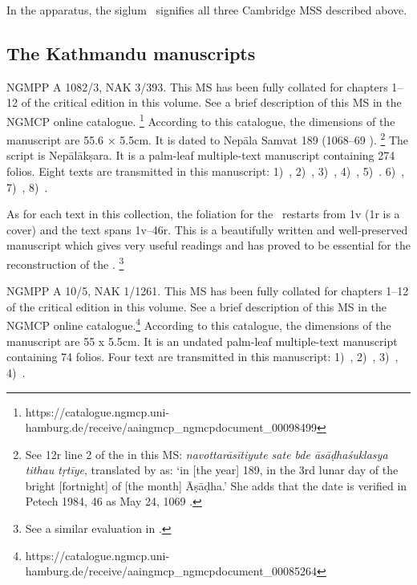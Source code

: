 In the apparatus, the siglum \mssCaCbCc\ signifies all three Cambridge 
MSS described above.

\medskip
\subsection{The Kathmandu manuscripts}
NGMPP A 1082/3, NAK 3/393. This MS has been fully 
collated for chapters 1--12 of the critical edition in this volume. 
See a brief description of this MS in
the NGMCP online catalogue.%
	\footnote{https://catalogue.ngmcp.uni-hamburg.de/receive/aaingmcp\_ngmcpdocument\_00098499}
According to this catalogue, the dimensions of the 
manuscript are 55.6 × 5.5cm. 
It is dated to Nepāla Samvat 189 (1068--69 \CE).%
	\footnote{See \fol12r line 2 of the 
	 in this MS: 
	\emph{navottarāsītiyute sate bde āsāḍhaśuklasya
  tithau tṛtīye}, translated by  as: 
  `in {[}the year{]} 189, in the 3rd lunar day of the bright {[}fortnight{]}
  of {[}the month{]} Āṣāḍha.' She adds that the date is verified in
  Petech 1984, 46 as May 24, 1069 \CE.} The script is Nepālākṣara. It is
a palm-leaf multiple-text manuscript containing 274 folios. Eight texts
are transmitted in this manuscript: 
1)~,
2)~, 
3)~, 
4)~, 
5)~.
6)~,
7)~,
8)~.

As for each text in this collection, the foliation for the
\VSS\ restarts from \fol1v (\fol1r is a cover) and the text
spans \fols1v--46r. This is a beautifully written and well-preserved
manuscript which gives very useful readings and has proved to be
essential for the reconstruction of the \Vss.%
	\footnote{See a similar evaluation in
					.}


NGMPP A 10/5, NAK 1/1261. This MS has been fully collated 
for chapters 1--12 of the critical edition in this volume. 
See a brief description of this MS in
the NGMCP online catalogue.\footnote{https://catalogue.ngmcp.uni-hamburg.de/receive/aaingmcp\_ngmcpdocument\_00085264}
According to this catalogue, the dimensions of the manuscript are 55 x
5.5cm. It is an undated palm-leaf multiple-text manuscript containing 74
folios. Four text are transmitted in this manuscript: 
1)~,
2)~,
3)~, 
4)~.

